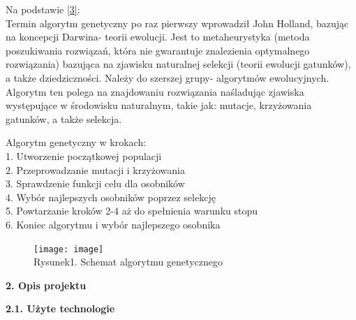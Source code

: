 \documentclass[a4paper, twoside, 12pt, justified]{article}
\begin{document}
	Na podstawie \hyperlink{ag}{[3]}:\\
	Termin algorytm genetyczny po raz pierwszy wprowadził John Holland, bazując na koncepcji Darwina- teorii ewolucji. Jest to metaheurystyka (metoda poszukiwania rozwiązań, która nie gwarantuje znalezienia optymalnego rozwiązania) bazująca na zjawisku naturalnej selekcji (teorii ewolucji gatunków), a także dziedziczności. Należy do szerszej grupy- algorytmów ewolucyjnych. Algorytm ten polega na znajdowaniu rozwiązania naśladując zjawiska występujące w środowisku naturalnym, takie jak: mutacje, krzyżowania gatunków, a także selekcja. \newpage
	
	Algorytm genetyczny w krokach:\\
	1. Utworzenie początkowej populacji\\
	2. Przeprowadzanie mutacji i krzyżowania\\
	3. Sprawdzenie funkcji celu dla osobników\\
	4. Wybór najlepszych osobników poprzez selekcję\\
	5. Powtarzanie kroków 2-4 aż do spełnienia warunku stopu\\
	6. Koniec algorytmu i wybór najlepszego osobnika
	
	\vspace{10mm}
	
	
	\begin{figure}[h]
	\texttt{[image: image]}
	\centering
	\\
	{Rysunek1. Schemat algorytmu genetycznego} 
	\end{figure}
	
	
	
	\newpage
	\begin{flushleft}
		\begin{large}
			\textbf{2. Opis projektu}
		\end{large}
	\end{flushleft}
	
	\vspace{5mm} %
	
	\begin{flushleft}
		\begin{large}
			\textbf{2.1. Użyte technologie}
		\end{large}
	\end{flushleft}
	\vspace{10mm} %
	
\end{document}
